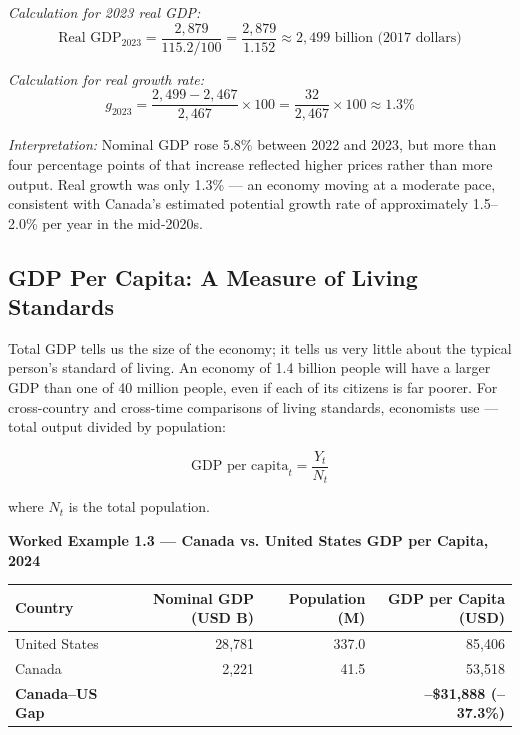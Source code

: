 \noindent\textit{Calculation for 2023 real GDP:}
\[
\text{Real GDP}_{2023} = \frac{2{,}879}{115.2/100} = \frac{2{,}879}{1.152} \approx 2{,}499 \text{ billion (2017 dollars)}
\]

\noindent\textit{Calculation for real growth rate:}
\[
g_{2023} = \frac{2{,}499 - 2{,}467}{2{,}467} \times 100 = \frac{32}{2{,}467} \times 100 \approx 1.3\%
\]

\noindent\textit{Interpretation:} Nominal GDP rose 5.8\% between 2022
and 2023, but more than four percentage points of that increase reflected
higher prices rather than more output. Real growth was only 1.3\% ---
an economy moving at a moderate pace, consistent with Canada's estimated
potential growth rate of approximately 1.5--2.0\% per year in the
mid-2020s.

\subsection{GDP Per Capita: A Measure of Living Standards}

Total GDP tells us the size of the economy; it tells us very little about
the typical person's standard of living. An economy of 1.4 billion people
will have a larger GDP than one of 40 million people, even if each of its
citizens is far poorer. For cross-country and cross-time comparisons
of living standards, economists use  --- total output
divided by population:

\begin{equation}
  \text{GDP per capita}_t = \frac{Y_t}{N_t}
  \label{eq:gdp_per_capita}
\end{equation}

\noindent where $N_t$ is the total population.

\noindent\textbf{Worked Example 1.3 --- Canada vs. United States GDP per Capita, 2024}

\begin{center}
\renewcommand{\arraystretch}{1.3}
\begin{tabular}{lrrr}
\toprule
Country & Nominal GDP (USD B) & Population (M) & GDP per Capita (USD) \\
\midrule
United States & 28{,}781 & 337.0 & 85{,}406 \\
Canada        & 2{,}221  &  41.5 & 53{,}518 \\
\midrule
\textbf{Canada--US Gap} & & & \textbf{--\$31{,}888 (--37.3\%)} \\
\bottomrule
\end{tabular}
\end{center}


